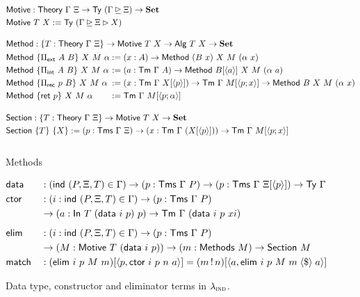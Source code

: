 \newcommand{\Msub}[1]{\langle{#1}\rangle}

\begin{figure}[H]
  \begin{align*}
  &\mta{Motive} : \Theory\ \Gamma\ \Xi \to \Ty\ (\Gamma \unrhd \Xi) \to \Set \\
  &\mta{Motive}\ T\ X := \Ty\ (\Gamma \unrhd \Xi \rhd X) \\[1em]
  &\mta{Method} : \{T : \Theory\ \Gamma\ \Xi\} \to \mta{Motive}\ T\ X \to \mta{Alg}\ T\ X \to \Set \\
  &\begin{alignedat}{2}
  &\mta{Method}\ \{\Pi_{\mta{ext}}\ A\ B\}\ X\ M\ \alpha &&:= (x : A) \to \mta{Method}\ (B\ x)\ X\ M\ (\alpha\ x) \\
  &\mta{Method}\ \{\Pi_{\mta{int}}\ A\ B\}\ X\ M\ \alpha &&:= (a : \Tm\ \Gamma\ A) \to \mta{Method}\ B [\langle a \rangle]\ X\ M\ (\alpha\ a) \\
  &\mta{Method}\ \{\Pi_{\mta{rec}}\ p\ B\}\ X\ M\ \alpha &&:= (x : \Tm\ \Gamma\ X [\langle p \rangle]) \to \Tm\ \Gamma\ M [\langle p ; x \rangle] \to \mta{Method}\ B\ X\ M\ (\alpha\ x) \\
  &\mta{Method}\ \{\mta{ret}\ p\}\ X\ M\ \alpha &&:= \Tm\ \Gamma\ M [\langle p ; \alpha \rangle] 
  \end{alignedat} \\[1em]
  &\mta{Section} : \{T : \Theory\ \Gamma\ \Xi\} \to \mta{Motive}\ T\ X \to \Set \\
  &\mta{Section}\ \{T\}\ \{X\} := (p : \Tms\ \Gamma\ \Xi) \to (x : \Tm\ \Gamma\ (X[\Msub p])) \to \Tm\ \Gamma\ M[\Msub {p; x}] \\[1em]
  \end{align*}
  \caption{Methods}
  \label{fig:lambdaind-motive-methods}
\end{figure}

\newcommand{\fmap}{\;\langle\$\rangle\;}

\begin{figure}[H]
  \begin{alignat*}{2}
  & \mta{data} &&: (\mta{ind}\ (P, \Xi, T) \in \Gamma) \to (p : \Tms\ \Gamma\ P) \to (p : \Tms\ \Gamma\ \Xi[\langle p \rangle]) \to \Ty\ \Gamma \\ 
  & \mta{ctor} &&: (i : \mta{ind}\ (P, \Xi, T) \in \Gamma) \to (p : \Tms\ \Gamma\ P) \\
  &            && \to (a : \mta{In}\ T\ (\mta{data}\ i\ p)\ p) \to \Tm\ \Gamma\ (\mta{data}\ i\ p\ xi) \\[0.5em]
  & \mta{elim} &&: (i : \mta{ind}\ (P, \Xi, T) \in \Gamma) \to (p : \Tms\ \Gamma\ P) \\ 
  &            && \to (M : \mta{Motive}\ T\ (\mta{data}\ i\ p)) \to (m : \mta{Methods}\ M) \to \mta{Section}\ M \\
  & \mta{match} &&: (\mta{elim}\ i\ p\ M\ m)[\langle p, \mta{ctor}\ i\ p\ n\ a \rangle] = (m\,!\,n)[\langle a , \mta{elim}\ i\ p\ M\ m \fmap a \rangle]
  \end{alignat*}
  \caption{Data type, constructor and eliminator terms in $\lambda_{\textsc{ind}}$.}
  \label{fig:lambdaind-data-ctor}
\end{figure}

